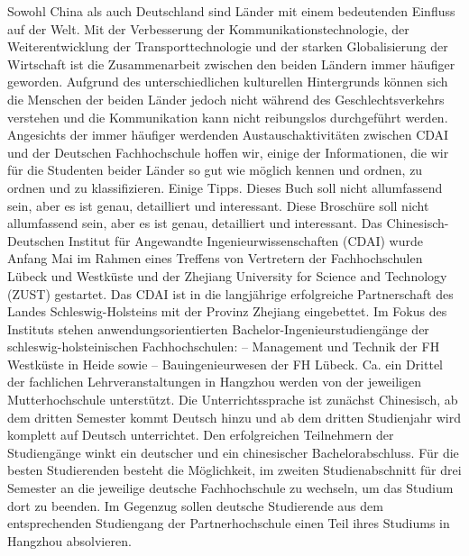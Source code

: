 \begin{minipage}{\linewidth}
	\Huge\rmfamily{} \par
\end{minipage}

 \vspace*{3cm}
 \mypar
Sowohl China als auch Deutschland sind L\"ander mit einem bedeutenden Einfluss auf der Welt. Mit der Verbesserung der Kommunikationstechnologie, der Weiterentwicklung der Transporttechnologie und der starken Globalisierung der Wirtschaft ist die Zusammenarbeit zwischen den beiden Ländern immer häufiger geworden. Aufgrund des unterschiedlichen kulturellen Hintergrunds können sich die Menschen der beiden Länder jedoch nicht während des Geschlechtsverkehrs verstehen und die Kommunikation kann nicht reibungslos durchgeführt werden. Angesichts der immer häufiger werdenden Austauschaktivitäten zwischen CDAI und der Deutschen Fachhochschule hoffen wir, einige der Informationen, die wir für die Studenten beider L\"ander so gut wie möglich kennen und ordnen, zu ordnen und zu klassifizieren. Einige Tipps. Dieses Buch soll nicht allumfassend sein, aber es ist genau, detailliert und interessant. Diese Broschüre soll nicht allumfassend sein, aber es ist genau, detailliert und interessant.
\mypar
Das Chinesisch-Deutschen Institut für Angewandte Ingenieurwissenschaften (CDAI) wurde Anfang Mai im Rahmen eines Treffens von Vertretern der Fachhochschulen Lübeck und Westküste und der Zhejiang University for Science and Technology (ZUST) gestartet. Das CDAI ist in die langjährige erfolgreiche Partnerschaft des Landes Schleswig-Holsteins mit der Provinz Zhejiang eingebettet. Im Fokus des Instituts stehen anwendungsorientierten Bachelor-Ingenieurstudiengänge der schleswig-holsteinischen Fachhochschulen: – Management und Technik der FH Westküste in Heide sowie – Bauingenieurwesen der FH Lübeck. Ca. ein Drittel der fachlichen Lehrveranstaltungen in Hangzhou werden von der jeweiligen Mutterhochschule unterstützt. Die Unterrichtssprache ist zunächst Chinesisch, ab dem dritten Semester kommt Deutsch hinzu und ab dem dritten Studienjahr wird komplett auf Deutsch unterrichtet. Den erfolgreichen Teilnehmern der Studiengänge winkt ein deutscher und ein chinesischer Bachelorabschluss. Für die besten Studierenden besteht die Möglichkeit, im zweiten Studienabschnitt für drei Semester an die jeweilige deutsche Fachhochschule zu wechseln, um das Studium dort zu beenden. Im Gegenzug sollen deutsche Studierende aus dem entsprechenden Studiengang der Partnerhochschule einen Teil ihres Studiums in Hangzhou absolvieren.

